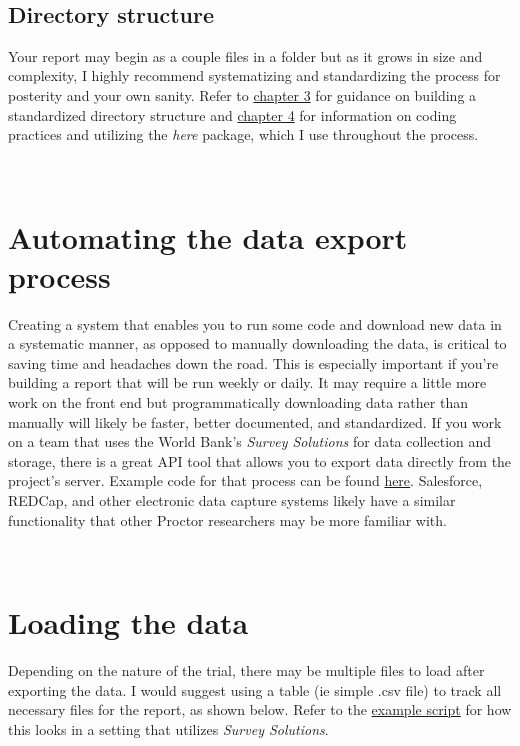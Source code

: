 \documentclass[
]{book}
\begin{document}
\(~\)

\subsection{Directory structure}\label{directory-structure-1}

Your report may begin as a couple files in a folder but as it grows in size and complexity, I highly recommend systematizing and standardizing the process for posterity and your own sanity. Refer to \href{directory-structure-and-code-repositories.html}{chapter 3} for guidance on building a standardized directory structure and \href{codingpractices.html}{chapter 4} for information on coding practices and utilizing the \emph{here} package, which I use throughout the process.

\(~\)

\section{Automating the data export process}\label{automating-the-data-export-process}

Creating a system that enables you to run some code and download new data in a systematic manner, as opposed to manually downloading the data, is critical to saving time and headaches down the road. This is especially important if you're building a report that will be run weekly or daily. It may require a little more work on the front end but programmatically downloading data rather than manually will likely be faster, better documented, and standardized. If you work on a team that uses the World Bank's \emph{Survey Solutions} for data collection and storage, there is a great API tool that allows you to export data directly from the project's server. Example code for that process can be found \href{templates/api_example.R}{here}. Salesforce, REDCap, and other electronic data capture systems likely have a similar functionality that other Proctor researchers may be more familiar with.

\(~\)

\section{Loading the data}\label{loading-the-data}

Depending on the nature of the trial, there may be multiple files to load after exporting the data. I would suggest using a table (ie simple .csv file) to track all necessary files for the report, as shown below. Refer to the \href{templates/read_clean_data_example.R}{example script} for how this looks in a setting that utilizes \emph{Survey Solutions}.
\end{document}
